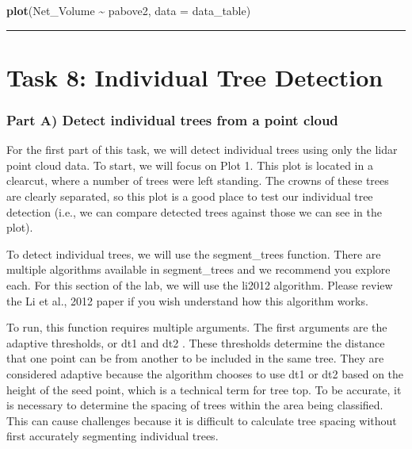 \documentclass[
]{book}
\newenvironment{Shaded}{\begin{snugshade}}{\end{snugshade}}
\newcommand{\AttributeTok}[1]{\textcolor[rgb]{0.13,0.29,0.53}{#1}}
\newcommand{\FunctionTok}[1]{\textcolor[rgb]{0.13,0.29,0.53}{\textbf{#1}}}
\newcommand{\NormalTok}[1]{#1}
\newcommand{\SpecialCharTok}[1]{\textcolor[rgb]{0.81,0.36,0.00}{\textbf{#1}}}
\begin{document}
\begin{Shaded}
\begin{Highlighting}[]
\FunctionTok{plot}\NormalTok{(Net\_Volume }\SpecialCharTok{\textasciitilde{}}\NormalTok{ pabove2, }\AttributeTok{data =}\NormalTok{ data\_table)}
\end{Highlighting}
\end{Shaded}

\begin{center}\rule{0.5\linewidth}{0.5pt}\end{center}

\hypertarget{task-8-individual-tree-detection}{%
\section*{Task 8: Individual Tree Detection}\label{task-8-individual-tree-detection}}

\hypertarget{part-a-detect-individual-trees-from-a-point-cloud}{%
\subsubsection*{Part A) Detect individual trees from a point cloud}\label{part-a-detect-individual-trees-from-a-point-cloud}}

For the first part of this task, we will detect individual trees using only the lidar point cloud data. To start, we will focus on Plot 1. This plot is located in a clearcut, where a number of trees were left standing. The crowns of these trees are clearly separated, so this plot is a good place to test our individual tree detection (i.e., we can compare detected trees against those we can see in the plot).

To detect individual trees, we will use the segment\_trees function. There are multiple algorithms available in segment\_trees and we recommend you explore each. For this section of the lab, we will use the li2012 algorithm. Please review the Li et al., 2012 paper if you wish understand how this algorithm works.

To run, this function requires multiple arguments. The first arguments are the adaptive thresholds, or dt1 and dt2 . These thresholds determine the distance that one point can be from another to be included in the same tree. They are considered adaptive because the algorithm chooses to use dt1 or dt2 based on the height of the seed point, which is a technical term for tree top. To be accurate, it is necessary to determine the spacing of trees within the area being classified. This can cause challenges because it is difficult to calculate tree spacing without first accurately segmenting individual trees.
\end{document}

